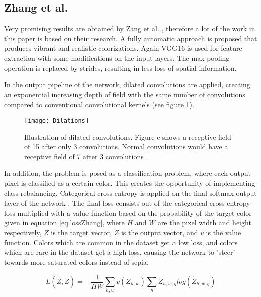 \subsection{Zhang et al.}
Very promising results are obtained by Zang et al. \cite{Zhang}, therefore a lot of the work in this paper is based on their research.
A fully automatic approach is proposed that produces vibrant and realistic colorizations. Again VGG16 is used for feature extraction with some modifications on the input layers. The max-pooling operation is replaced by strides, resulting in less loss of spatial information. 

In the output pipeline of the network, dilated convolutions \cite{yu2015multi} are applied, creating an exponential increasing depth of field with the same number of convolutions compared to conventional convolutional kernels (see figure \ref{fig:dilations}).

\begin{figure}[h]
	\centering
	\texttt{[image: Dilations]}
	\caption{Illustration of dilated convolutions. Figure c shows a receptive field of 15 after only 3 convolutions. Normal convolutions would have a receptive field of 7 after 3 convolutions \cite{yu2015multi}.}
	\label{fig:dilations}
\end{figure}

In addition, the problem is posed as a classification problem, where each output pixel is classified as a certain color. This creates the opportunity of implementing class-rebalancing.
Categorical cross-entropy is applied on the final softmax output layer of the network \cite{de2005tutorial}. The final loss consists out of the categorical cross-entropy loss multiplied with a value function based on the probability of the target color given in equation \ref{eq:lossZhang}, where $H$ and $W$ are the pixel width and height respectively, $Z$ is the target vector, $\widetilde{Z}$ is the output vector, and $v$ is the value function.
Colors which are common in the dataset get a low loss, and colors which are rare in the dataset get a high loss, causing the network to 'steer' towards more saturated colors instead of sepia. 

\begin{equation}
L(\widetilde{Z},Z)=-\frac{1}{HW}\sum_{h,w}v(Z_{h,w})\sum_q^{}{Z_{h,w,q}log({\widetilde{Z}_{h,w,q}})}
\label{eq:lossZhang}
\end{equation}

